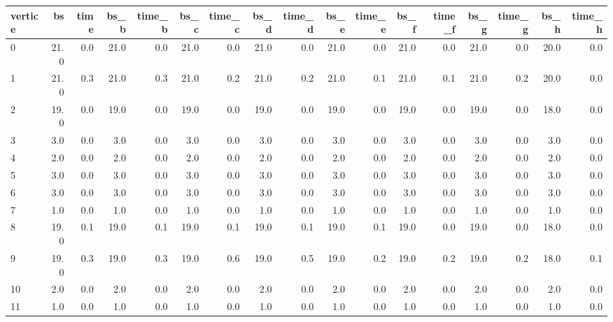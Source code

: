 \begin{tabular}{lrrrrrrrrrrrrrrrr}
\toprule
vertice &    bs &  time &  bs\_b &  time\_b &  bs\_c &  time\_c &  bs\_d &  time\_d &  bs\_e &  time\_e &  bs\_f &  time\_f &  bs\_g &  time\_g &  bs\_h &  time\_h \\
\midrule
      0 &  21.0 &   0.0 &  21.0 &     0.0 &  21.0 &     0.0 &  21.0 &     0.0 &  21.0 &     0.0 &  21.0 &     0.0 &  21.0 &     0.0 &  20.0 &     0.0 \\
      1 &  21.0 &   0.3 &  21.0 &     0.3 &  21.0 &     0.2 &  21.0 &     0.2 &  21.0 &     0.1 &  21.0 &     0.1 &  21.0 &     0.2 &  20.0 &     0.0 \\
      2 &  19.0 &   0.0 &  19.0 &     0.0 &  19.0 &     0.0 &  19.0 &     0.0 &  19.0 &     0.0 &  19.0 &     0.0 &  19.0 &     0.0 &  18.0 &     0.0 \\
      3 &   3.0 &   0.0 &   3.0 &     0.0 &   3.0 &     0.0 &   3.0 &     0.0 &   3.0 &     0.0 &   3.0 &     0.0 &   3.0 &     0.0 &   3.0 &     0.0 \\
      4 &   2.0 &   0.0 &   2.0 &     0.0 &   2.0 &     0.0 &   2.0 &     0.0 &   2.0 &     0.0 &   2.0 &     0.0 &   2.0 &     0.0 &   2.0 &     0.0 \\
      5 &   3.0 &   0.0 &   3.0 &     0.0 &   3.0 &     0.0 &   3.0 &     0.0 &   3.0 &     0.0 &   3.0 &     0.0 &   3.0 &     0.0 &   3.0 &     0.0 \\
      6 &   3.0 &   0.0 &   3.0 &     0.0 &   3.0 &     0.0 &   3.0 &     0.0 &   3.0 &     0.0 &   3.0 &     0.0 &   3.0 &     0.0 &   3.0 &     0.0 \\
      7 &   1.0 &   0.0 &   1.0 &     0.0 &   1.0 &     0.0 &   1.0 &     0.0 &   1.0 &     0.0 &   1.0 &     0.0 &   1.0 &     0.0 &   1.0 &     0.0 \\
      8 &  19.0 &   0.1 &  19.0 &     0.1 &  19.0 &     0.1 &  19.0 &     0.1 &  19.0 &     0.1 &  19.0 &     0.0 &  19.0 &     0.0 &  18.0 &     0.0 \\
      9 &  19.0 &   0.3 &  19.0 &     0.3 &  19.0 &     0.6 &  19.0 &     0.5 &  19.0 &     0.2 &  19.0 &     0.2 &  19.0 &     0.2 &  18.0 &     0.1 \\
     10 &   2.0 &   0.0 &   2.0 &     0.0 &   2.0 &     0.0 &   2.0 &     0.0 &   2.0 &     0.0 &   2.0 &     0.0 &   2.0 &     0.0 &   2.0 &     0.0 \\
     11 &   1.0 &   0.0 &   1.0 &     0.0 &   1.0 &     0.0 &   1.0 &     0.0 &   1.0 &     0.0 &   1.0 &     0.0 &   1.0 &     0.0 &   1.0 &     0.0 \\

\end{tabular}
